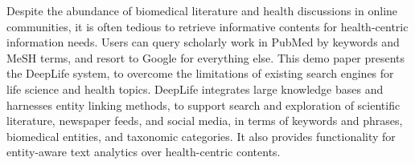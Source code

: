 Despite the abundance of biomedical literature and health discussions in online communities, it is often tedious to retrieve informative contents for health-centric information needs. Users can query scholarly work in PubMed by keywords and MeSH terms, and resort to Google for everything else. This demo paper presents the DeepLife system, to overcome the limitations of existing search engines for life science and health topics. DeepLife integrates large knowledge bases and harnesses entity linking methods, to support search and exploration of scientific literature, newspaper feeds, and social media, in terms of keywords and phrases, biomedical entities, and taxonomic categories. It also provides functionality for entity-aware text analytics over health-centric contents.
